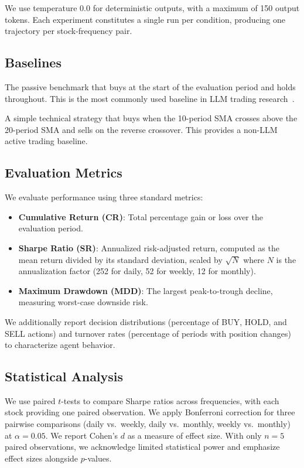We use temperature 0.0 for deterministic outputs, with a maximum of 150 output tokens. Each experiment constitutes a single run per condition, producing one trajectory per stock-frequency pair.

\subsection{Baselines}

The passive benchmark that buys at the start of the evaluation period and holds throughout. This is the most commonly used baseline in LLM trading research~\citep{ding2024survey}.

A simple technical strategy that buys when the 10-period SMA crosses above the 20-period SMA and sells on the reverse crossover. This provides a non-LLM active trading baseline.

\subsection{Evaluation Metrics}

We evaluate performance using three standard metrics:
\begin{itemize}[leftmargin=*,itemsep=0pt,topsep=0pt]
    \item \textbf{Cumulative Return (CR)}: Total percentage gain or loss over the evaluation period.
    \item \textbf{Sharpe Ratio (SR)}: Annualized risk-adjusted return, computed as the mean return divided by its standard deviation, scaled by $\sqrt{N}$ where $N$ is the annualization factor (252 for daily, 52 for weekly, 12 for monthly).
    \item \textbf{Maximum Drawdown (MDD)}: The largest peak-to-trough decline, measuring worst-case downside risk.
\end{itemize}

We additionally report decision distributions (percentage of BUY, HOLD, and SELL actions) and turnover rates (percentage of periods with position changes) to characterize agent behavior.

\subsection{Statistical Analysis}

We use paired $t$-tests to compare Sharpe ratios across frequencies, with each stock providing one paired observation. We apply Bonferroni correction for three pairwise comparisons (daily vs.\ weekly, daily vs.\ monthly, weekly vs.\ monthly) at $\alpha = 0.05$. We report Cohen's $d$ as a measure of effect size. With only $n=5$ paired observations, we acknowledge limited statistical power and emphasize effect sizes alongside $p$-values.
